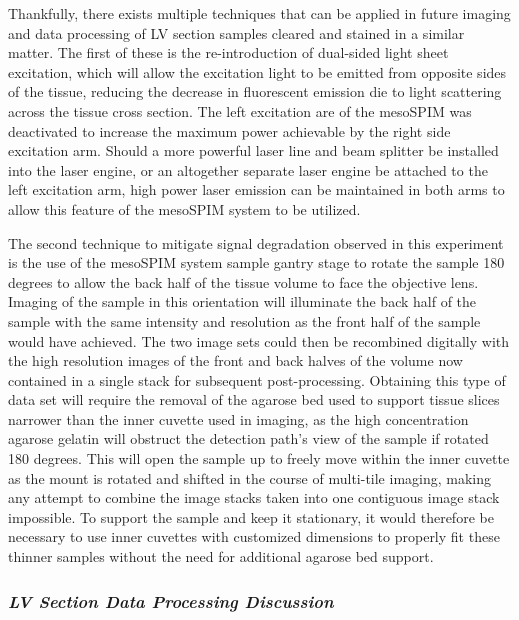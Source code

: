 Thankfully, there exists multiple techniques that can be applied in future imaging and data processing of LV section samples cleared and stained in a similar matter. The first of these is the re-introduction of dual-sided light sheet excitation, which will allow the excitation light to be emitted from opposite sides of the tissue, reducing the decrease in fluorescent emission die to light scattering across the tissue cross section. The left excitation are of the mesoSPIM was deactivated to increase the maximum power achievable by the right side excitation arm. Should a more powerful laser line and beam splitter be installed into the laser engine, or an altogether separate laser engine be attached to the left excitation arm, high power laser emission can be maintained in both arms to allow this feature of the mesoSPIM system to be utilized.

The second technique to mitigate signal degradation observed in this experiment is the use of the mesoSPIM system sample gantry stage to rotate the sample 180 degrees to allow the back half of the tissue volume to face the objective lens. Imaging of the sample in this orientation will illuminate the back half of the sample with the same intensity and resolution as the front half of the sample would have achieved. The two image sets could then be recombined digitally with the high resolution images of the front and back halves of the volume now contained in a single stack for subsequent post-processing. Obtaining this type of data set will require the removal of the agarose bed used to support tissue slices narrower than the inner cuvette used in imaging, as the high concentration agarose gelatin will obstruct the detection path's view of the sample if rotated 180 degrees. This will open the sample up to freely move within the inner cuvette as the mount is rotated and shifted in the course of multi-tile imaging, making any attempt to combine the image stacks taken into one contiguous image stack impossible. To support the sample and keep it stationary, it would therefore be necessary to use inner cuvettes with customized dimensions to properly fit these thinner samples without the need for additional agarose bed support. 

\subsubsection{\textit{LV Section Data Processing Discussion}}

